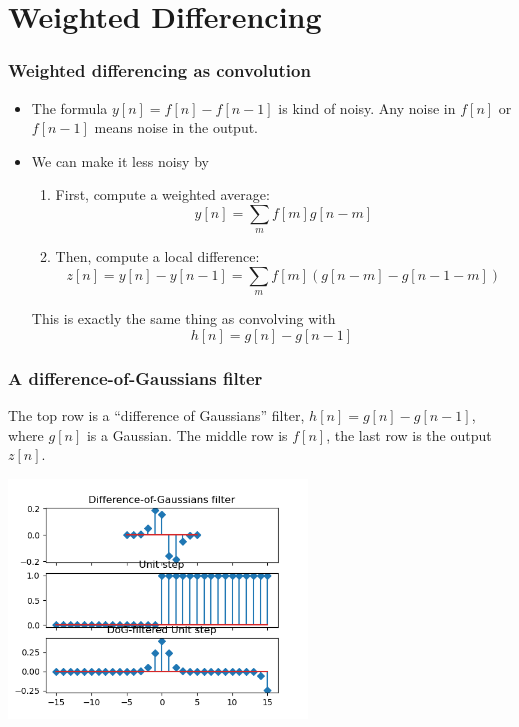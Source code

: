 \documentclass{beamer}
\begin{document}
\section[Weighted]{Weighted Differencing}
\setcounter{subsection}{1}

\begin{frame}
  \frametitle{Weighted differencing as convolution}
  \begin{itemize}
    \item 
      The formula $y[n]=f[n]-f[n-1]$ is kind of noisy.  Any noise in
      $f[n]$ or $f[n-1]$ means noise in the output.
    \item
      We can make it less noisy  by
      \begin{enumerate}
      \item First, compute a weighted average:
        \[
        y[n] = \sum_m f[m]g[n-m]
        \]
      \item Then, compute a local difference:
        \[
        z[n] = y[n] - y[n-1] = \sum_m f[m]\left(g[n-m]-g[n-1-m]\right)
        \]
      \end{enumerate}
      This is exactly the same thing as convolving with
      \[
      h[n] = g[n]-g[n-1]
      \]
  \end{itemize}
\end{frame}

\begin{frame}
  \frametitle{A difference-of-Gaussians filter}

  The top row is a ``difference of Gaussians'' filter,
  $h[n]=g[n]-g[n-1]$, where $g[n]$ is a Gaussian.  The middle row is
  $f[n]$, the last row is the output $z[n]$.
  \centerline{\includegraphics[height=2.5in]{mp3fig7.png}}
\end{frame}
\end{document}

